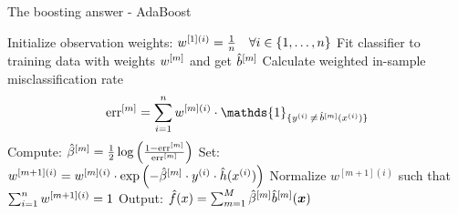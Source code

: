 \begin{vbframe}{The boosting answer - AdaBoost}
% 


\framebreak

\begin{algorithm}[H]
  \begin{algorithmic}[1]
    \State Initialize observation weights: $w^{[1](i)} = \frac{1}{n} \quad \forall i \in \{1, \ldots, n\}$
      \State Fit classifier to training data with weights $w^{[m]}$ and get $\hat{b}^{[m]}$
      \State Calculate weighted in-sample misclassification rate
      $$
        \errm = \sumin \wmi \cdot \mathds{1}_{\{\yi \,\neq\, \bmmh(\xi)\}}
      $$
      \State Compute: $ \hat{\beta}^{[m]} = \frac{1}{2} \log \left( \frac{1 - \text{err}^{[m]}}{\text{err}^{[m]}}\right)$
      \State Set: $w^{[m+1](i)} = w^{[m](i)} \cdot \exp\left(- \hat{\beta}^{[m]} \cdot
        y^{(i)} \cdot \hat{h}(x^{(i)})\right) $
      \State Normalize $w^{[m+1](i)}$ such that $\sum_{i=1}^n w^{[m+1](i)} = 1$
    \EndFor
    \State Output: $\hat{f}(x) = \sum_{m=1}^{M} \hat{\beta}^{[m]} \hat{b}^{[m]}(\bm{x})$
  \end{algorithmic}
  \caption{AdaBoost}
\end{algorithm}

\end{vbframe}


